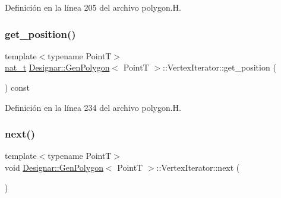 Definición en la línea 205 del archivo polygon.\+H.

\mbox{\label{class_designar_1_1_gen_polygon_1_1_vertex_iterator_a44f1777dd9aa54546cd497500a5232fb}} 
\subsubsection{\texorpdfstring{get\+\_\+position()}{get\_position()}}
{\footnotesize\ttfamily template$<$typename PointT$>$ \\
\hyperlink{namespace_designar_aa72662848b9f4815e7bf31a7cf3e33d1}{nat\+\_\+t} \hyperlink{class_designar_1_1_gen_polygon}{Designar\+::\+Gen\+Polygon}$<$ PointT $>$\+::Vertex\+Iterator\+::get\+\_\+position (\begin{DoxyParamCaption}{ }\end{DoxyParamCaption}) const\hspace{0.3cm}{\ttfamily [inline]}}



Definición en la línea 234 del archivo polygon.\+H.

\mbox{\label{class_designar_1_1_gen_polygon_1_1_vertex_iterator_a85d990ecb087c96de85b6743d0e2ab0b}} 
\subsubsection{\texorpdfstring{next()}{next()}}
{\footnotesize\ttfamily template$<$typename PointT$>$ \\
void \hyperlink{class_designar_1_1_gen_polygon}{Designar\+::\+Gen\+Polygon}$<$ PointT $>$\+::Vertex\+Iterator\+::next (\begin{DoxyParamCaption}{ }\end{DoxyParamCaption})\hspace{0.3cm}{\ttfamily [inline]}}



